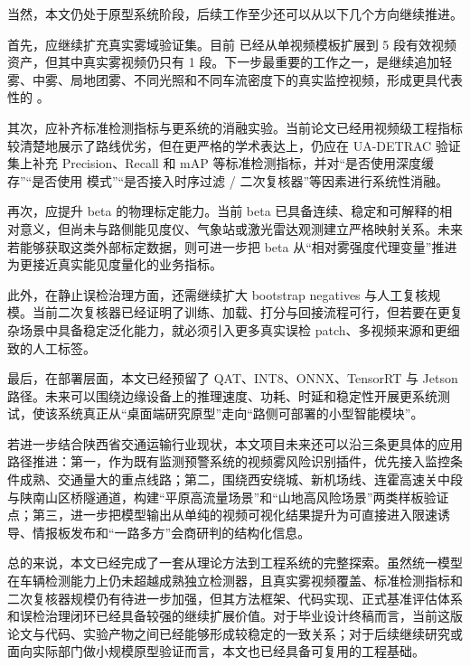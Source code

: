 当然，本文仍处于原型系统阶段，后续工作至少还可以从以下几个方向继续推进。

首先，应继续扩充真实雾域验证集。目前  已经从单视频模板扩展到 5 段有效视频资产，但其中真实雾视频仍只有 1 段。下一步最重要的工作之一，是继续追加轻雾、中雾、局地团雾、不同光照和不同车流密度下的真实监控视频，形成更具代表性的 。

其次，应补齐标准检测指标与更系统的消融实验。当前论文已经用视频级工程指标较清楚地展示了路线优劣，但在更严格的学术表达上，仍应在 UA-DETRAC 验证集上补充 Precision、Recall 和 mAP 等标准检测指标，并对“是否使用深度缓存”“是否使用  模式”“是否接入时序过滤 / 二次复核器”等因素进行系统性消融。

再次，应提升 beta 的物理标定能力。当前 beta 已具备连续、稳定和可解释的相对意义，但尚未与路侧能见度仪、气象站或激光雷达观测建立严格映射关系。未来若能够获取这类外部标定数据，则可进一步把 beta 从“相对雾强度代理变量”推进为更接近真实能见度量化的业务指标。

此外，在静止误检治理方面，还需继续扩大 bootstrap negatives 与人工复核规模。当前二次复核器已经证明了训练、加载、打分与回接流程可行，但若要在更复杂场景中具备稳定泛化能力，就必须引入更多真实误检 patch、多视频来源和更细致的人工标签。

最后，在部署层面，本文已经预留了 QAT、INT8、ONNX、TensorRT 与 Jetson 路径。未来可以围绕边缘设备上的推理速度、功耗、时延和稳定性开展更系统测试，使该系统真正从“桌面端研究原型”走向“路侧可部署的小型智能模块”。

若进一步结合陕西省交通运输行业现状，本文项目未来还可以沿三条更具体的应用路径推进：第一，作为既有监测预警系统的视频雾风险识别插件，优先接入监控条件成熟、交通量大的重点线路；第二，围绕西安绕城、新机场线、连霍高速关中段与陕南山区桥隧通道，构建“平原高流量场景”和“山地高风险场景”两类样板验证点；第三，进一步把模型输出从单纯的视频可视化结果提升为可直接进入限速诱导、情报板发布和“一路多方”会商研判的结构化信息\cite{shaanxiMeeting2026,shaanxiWeekly2025,shaanxiRiskProject2025}。

总的来说，本文已经完成了一套从理论方法到工程系统的完整探索。虽然统一模型在车辆检测能力上仍未超越成熟独立检测器，且真实雾视频覆盖、标准检测指标和二次复核器规模仍有待进一步加强，但其方法框架、代码实现、正式基准评估体系和误检治理闭环已经具备较强的继续扩展价值。对于毕业设计终稿而言，当前这版论文与代码、实验产物之间已经能够形成较稳定的一致关系；对于后续继续研究或面向实际部门做小规模原型验证而言，本文也已经具备可复用的工程基础。
